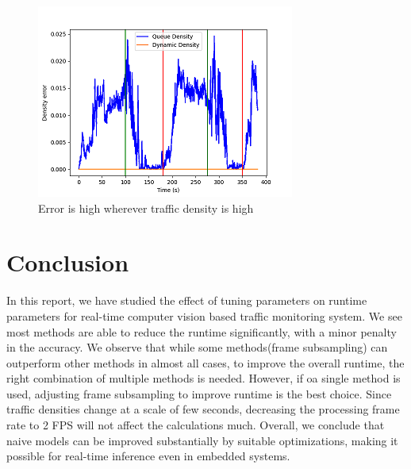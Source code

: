\documentclass[conference]{IEEEtran}
\begin{document}
\begin{figure}[htbp]
    \centerline{\includegraphics{plots/plot_lowres_error.png}}
    \caption{Error is high wherever traffic density is high}
    \label{low_res_err}
\end{figure}

\section{Conclusion}

In this report, we have studied the effect of tuning parameters on runtime parameters for real-time computer vision based traffic monitoring system.
We see most methods are able to reduce the runtime significantly, with a minor penalty in the accuracy.
We observe that while some methods(frame subsampling) can outperform other methods in almost all cases, to improve the overall runtime, the right combination of multiple methods is needed.
However, if oa single method is used, adjusting frame subsampling to improve runtime is the best choice. Since traffic densities change at a scale of few seconds, decreasing the processing frame rate to 2 FPS will not affect the calculations much.
Overall, we conclude that naive models can be improved substantially by suitable optimizations, making it possible for real-time inference even in embedded systems.




\vspace{12pt}
\end{document}
